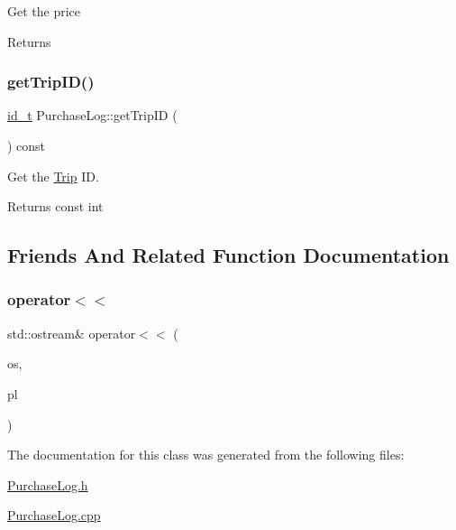Get the price \begin{DoxyReturn}{Returns}

\end{DoxyReturn}
\mbox{\label{classPurchaseLog_ae420531b2c843e42a703a380badb7c91}} 
\subsubsection{\texorpdfstring{get\+Trip\+I\+D()}{getTripID()}}
{\footnotesize\ttfamily \mbox{\hyperlink{project__utils_8h_a8f3a969054ad2200720b96e7e23dd4e1}{id\+\_\+t}} Purchase\+Log\+::get\+Trip\+ID (\begin{DoxyParamCaption}{ }\end{DoxyParamCaption}) const}



Get the \mbox{\hyperlink{classTrip}{Trip}} ID. 

\begin{DoxyReturn}{Returns}
const int 
\end{DoxyReturn}


\subsection{Friends And Related Function Documentation}
\mbox{\label{classPurchaseLog_a49c8f4f31115140c5700334bd9933525}} 
\subsubsection{\texorpdfstring{operator$<$$<$}{operator<<}}
{\footnotesize\ttfamily std\+::ostream\& operator$<$$<$ (\begin{DoxyParamCaption}\item[{std\+::ostream \&}]{os,  }\item[{\mbox{\hyperlink{classPurchaseLog}{Purchase\+Log}} \&}]{pl }\end{DoxyParamCaption})\hspace{0.3cm}{\ttfamily [friend]}}



The documentation for this class was generated from the following files\+:\begin{DoxyCompactItemize}
\item 
\mbox{\hyperlink{PurchaseLog_8h}{Purchase\+Log.\+h}}\item 
\mbox{\hyperlink{PurchaseLog_8cpp}{Purchase\+Log.\+cpp}}\end{DoxyCompactItemize}
